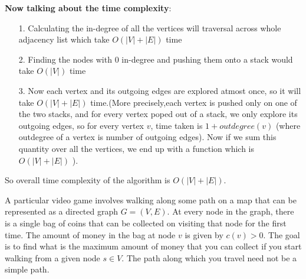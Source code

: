 \documentclass[answers]{exam}
\begin{document}
\begin{questions}
\begin{solution}
\begin{comment}
Therefore, for a non-null DAG with $k+1$ nodes, length of the longest path is : $1$ $+$ length of the longest path in the DAG obtained after removing all nodes with $0$ indegree.

\textbf{All 5 arguments proved!! }\par

\end{comment}


\textbf{Now talking about the time complexity}:
\begin{enumerate}
    \item [1.] Calculating the in-degree of all the vertices will traversal across whole adjacency list which take $O(|V|+|E|)$ time
    \item [2.] Finding the nodes with $0$ in-degree and pushing them onto a stack would take $O(|V|)$ time
    \item [3.] Now each vertex and its outgoing edges are explored atmost once, so it will take $O(|V|+|E|)$ time.(More precisely,each vertex is pushed only on one of the two stacks, and for every vertex poped out of a stack, we only explore its outgoing edges, so for every vertex $v$, time taken is $1+outdegree(v)$ (where outdegree of a vertex is number of outgoing edges). Now if we sum this quantity over all the vertices, we end up with a function which is $O(|V|+|E|)$  ).
\end{enumerate}

So overall time complexity of the algorithm is $O(|V|+|E|)$.












\end{solution}


\vspace{0.3in}









\question A particular video game involves walking along some path on a map that can be represented as a directed graph $G = (V, E)$. 
At every node in the graph, there is a single bag of coins that can be collected on visiting that node for the first time. 
The amount of money in the bag at node $v$ is given by $c(v) > 0$.
The goal is to find what is the maximum amount of money that you can collect if you start walking from a given node $s \in V$.
The path along which you travel need not be a simple path. 


\end{questions}
\end{document}
